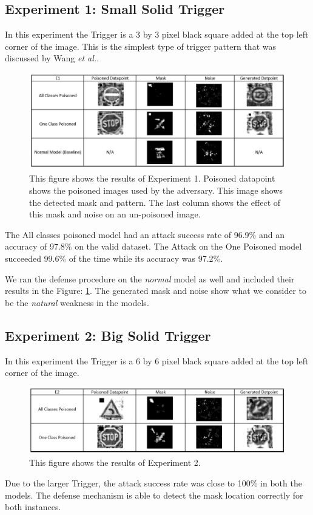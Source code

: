 \documentclass{article}
\newcommand{\etal}[0]{\emph{et al.}}
\newcommand{\fig}[1]{Figure: #1}
\begin{document}
\subsection{Experiment 1: Small Solid Trigger}
In this experiment the Trigger is a 3 by 3 pixel black square added at the top left corner of the image. This is the simplest type of trigger pattern that was discussed by Wang \etal \cite{wangNeuralCleanseIdentifying}. 
\begin{figure}[h]
    \centering
    \includegraphics[width=.75\textwidth]{E1.PNG}
    \caption{This figure shows the results of Experiment 1. Poisoned datapoint shows the poisoned images used by the adversary. This image shows the detected mask and pattern. The last column shows the effect of this mask and noise on an un-poisoned image.}
    \label{fig:E1}
\end{figure}
The All classes poisoned model had an attack success rate of 96.9\% and an accuracy of 97.8\% on the valid dataset. The Attack on the One Poisoned model succeeded 99.6\% of the time while its accuracy was 97.2\%.

We ran the defense procedure on the \emph{normal} model as well and included their results in the \fig{\ref{fig:E1}}. The generated mask and noise show what we consider to be the \emph{natural} weakness in the models.
\subsection{Experiment 2: Big Solid Trigger}
In this experiment the Trigger is a 6 by 6 pixel black square added at the top left corner of the image.
\begin{figure}[h]
    \centering
    \includegraphics[width=.75\textwidth]{E2.PNG}
    \caption{This figure shows the results of Experiment 2.}
    \label{fig:E2}
\end{figure}
Due to the larger Trigger, the attack success rate was close to 100\% in both the models. The defense mechanism is able to detect the mask location correctly for both instances.
\end{document}
